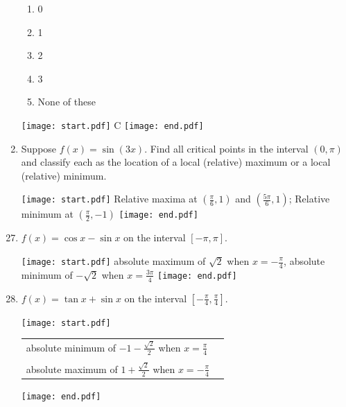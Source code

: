 \documentclass[12pt]{article}
\begin{document}
\begin{enumerate}
\begin{enumerate}

\item 0

\item 1

\item 2

\item 3

\item None of these

\end{enumerate}

\texttt{[image: start.pdf]}
{{C}}
\texttt{[image: end.pdf]}


\item Suppose $f(x) = \sin{(3x)}$.  Find all critical points in the interval $(0,\pi)$ and classify each as the location of a local (relative) maximum or a local (relative) minimum. 

\texttt{[image: start.pdf]}
{{Relative maxima at $\left(\frac{\pi}{6},1\right)$ and $\left(\frac{5\pi}{6},1\right)$; Relative minimum at $\left(\frac{\pi}{2},-1\right)$}}
\texttt{[image: end.pdf]}


\end{enumerate}


\begin{enumerate}
\setcounter{enumi}{26}

\item $f(x) = \cos{x}-\sin{x}$ on the interval $[-\pi,\pi]$. 

\texttt{[image: start.pdf]}
{{absolute maximum of $\sqrt{2}$ when $x=-\frac{\pi}{4}$, absolute minimum of $-\sqrt{2}$ when $x=\frac{3\pi}{4}$}}
\texttt{[image: end.pdf]}


\item $f(x) = \tan{x}+\sin{x}$ on the interval $\left[-\frac{\pi}{4}, \frac{\pi}{4}\right]$. 

\texttt{[image: start.pdf]}
{{\begin{tabular}{ll}
absolute minimum of $-1-\frac{\sqrt{2}}{2}$ when $x=\frac{\pi}{4}$\\
\\
absolute maximum of $1+\frac{\sqrt{2}}{2}$ when $x=-\frac{\pi}{4}$
\end{tabular}
}}
\texttt{[image: end.pdf]}


\end{enumerate}
\end{document}
